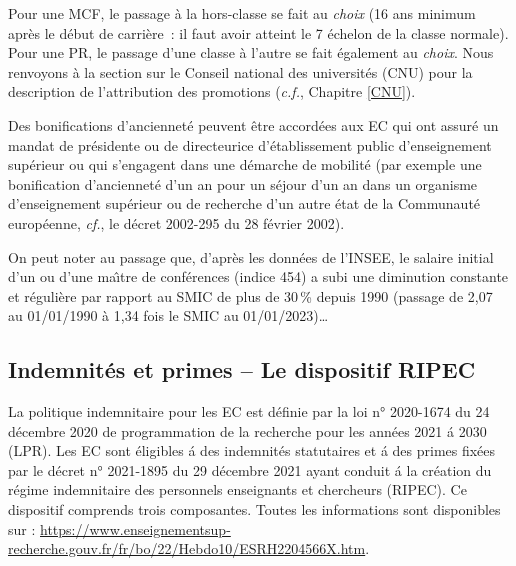 Pour un\mp e MCF, le passage \`a la hors-classe se fait au {\em choix} (16 ans minimum
apr\`es le d\'ebut de carri\`ere~: il faut avoir atteint le
7\ieme{} \'echelon de la classe normale).
Pour un\mp e PR, le passage d'une classe \`a l'autre se fait \'egalement au {\em choix}.
Nous renvoyons \`a la section sur le Conseil national des universit\'es (CNU) pour la
description de l'attribution des promotions (\textit{c.f.}, Chapitre \ref{CNU}).

Des bonifications d'anciennet\'e peuvent \^etre accord\'ees aux EC
qui ont assur\'e un mandat de pr\'esident\mp e
ou de directeur\mp ice d'\'etablissement public d'enseignement sup\'erieur
ou qui s'engagent dans une d\'emarche de
mobilit\'e (par exemple une bonification d'anciennet\'e d'un an
pour un s\'ejour d'un an dans un organisme d'enseignement sup\'erieur
ou de recherche d'un autre \'etat de la Communaut\'e europ\'eenne,
{\em cf.}, le d\'ecret 2002-295 du 28 f\'evrier 2002).


On peut noter au passage que, d'apr\`es les donn\'ees de l'INSEE, le salaire initial d'un ou d'une ma\^\i tre de
conf\'erences (indice 454) a subi une diminution constante et r\'eguli\`ere
par rapport au SMIC de plus de 30\,\% depuis 1990 (passage de 2,07 au 01/01/1990 \`a 1,34 fois le SMIC au 01/01/2023)\ldots


\subsection{Indemnit\'es et primes -- Le dispositif RIPEC}

La politique indemnitaire pour les EC est d\'efinie par la loi n° 2020-1674 du 24 d\'ecembre 2020 de programmation de la recherche pour les ann\'ees 2021 \'a 2030 (LPR). Les EC sont \'eligibles \'a des indemnit\'es statutaires et \'a des primes fix\'ees par le d\'ecret n° 2021-1895 du 29 d\'ecembre 2021 ayant conduit \'a la cr\'eation du r\'egime indemnitaire des personnels enseignants et chercheurs (RIPEC). Ce dispositif comprends trois composantes. Toutes les informations sont disponibles sur : \url{https://www.enseignementsup-recherche.gouv.fr/fr/bo/22/Hebdo10/ESRH2204566X.htm}.

